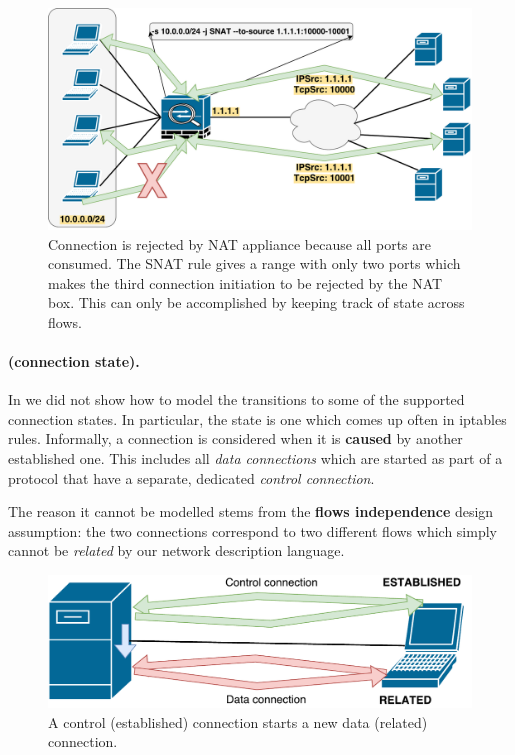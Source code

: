 \begin{figure}[h]
  \centering
  \captionsetup{justification=centering}
  \includegraphics[scale=0.5]{assets/img/nat-global-state}
  \caption[Connection is rejected by NAT appliance because all ports are
  consumed.]{Connection is rejected by NAT appliance because all ports are
  consumed. The SNAT rule gives a range with only two ports which makes the
  third connection initiation to be rejected by the NAT box.  This can only be
  accomplished by keeping track of state across flows.}
  \label{fig:nat-global-state}
\end{figure}

\paragraph{\RELATED (connection state).}
In  we did not show how to model
the transitions to some of the supported connection states.  In particular, the
\RELATED state is one which comes up often in iptables rules.  Informally, a
connection is considered \RELATED when it is \textbf{caused} by another
established one.  This includes all \emph{data connections} which are started
as part of a protocol that have a separate, dedicated \emph{control
connection}.

The reason it cannot be modelled stems from the \textbf{flows independence}
design assumption: the two connections correspond to two different flows which
simply cannot be \emph{related} by our network description language.

\begin{figure}[h]
  \centering
  \captionsetup{justification=centering}
  \includegraphics[scale=0.5]{assets/img/related-state}
  \caption{A control (established) connection starts a new data (related)
  connection.}
  \label{fig:related-state}
\end{figure}

